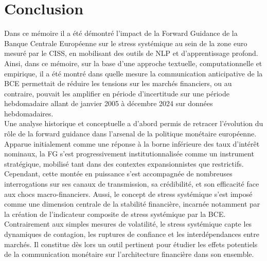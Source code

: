 \chapter*{Conclusion}

Dans ce mémoire il a été démontré l’impact de la Forward Guidance de la Banque Centrale Européenne sur le stress systémique au sein de la zone euro mesuré par le CISS, en mobilisant des outils de NLP et d’apprentissage profond. Ainsi, dans ce mémoire, sur la base d’une approche textuelle, computationnelle et empirique, il a été montré dans quelle mesure la communication anticipative de la BCE permettait de réduire les tensions sur les marchés financiers, ou au contraire, pouvait les amplifier en période d’incertitude sur une période hebdomadaire allant de janvier 2005 à décembre 2024 sur données hebdomadaires.\\

Une analyse historique et conceptuelle a d'abord permis de retracer l’évolution du rôle de la forward guidance dans l’arsenal de la politique monétaire européenne. Apparue initialement comme une réponse à la borne inférieure des taux d’intérêt nominaux, la FG s’est progressivement institutionnalisée comme un instrument stratégique, mobilisé tant dans des contextes expansionnistes que restrictifs. Cependant, cette montée en puissance s’est accompagnée de nombreuses interrogations sur ses canaux de transmission, sa crédibilité, et son efficacité face aux chocs macro-financiers. Aussi, le concept de stress systémique s’est imposé comme une dimension centrale de la stabilité financière, incarnée notamment par la création de l’indicateur composite de stress systémique par la BCE. Contrairement aux simples mesures de volatilité, le stress systémique capte les dynamiques de contagion, les ruptures de confiance et les interdépendances entre marchés. Il constitue dès lors un outil pertinent pour étudier les effets potentiels de la communication monétaire sur l’architecture financière dans son ensemble.\\

